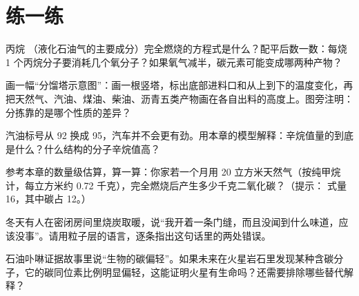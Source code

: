 \section*{练一练}

\begin{sikaoti}
\item 丙烷 （液化石油气的主要成分）完全燃烧的方程式是什么？配平后数一数：每烧 1 个丙烷分子要消耗几个氧分子？如果氧气减半，碳元素可能变成哪两种产物？
\item 画一幅“分馏塔示意图”：画一根竖塔，标出底部进料口和从上到下的温度变化，再把天然气、汽油、煤油、柴油、沥青五类产物画在各自出料的高度上。图旁注明：分拣靠的是哪个性质的差异？
\item 汽油标号从 92 换成 95，汽车并不会更有劲。用本章的模型解释：辛烷值量的到底是什么？什么结构的分子辛烷值高？
\item 参考本章的数量级估算，算一算：你家若一个月用 20 立方米天然气（按纯甲烷计，每立方米约 0.72 千克），完全燃烧后产生多少千克二氧化碳？（提示： 式量 16，其中碳占 12。）
\item 冬天有人在密闭房间里烧炭取暖，说“我开着一条门缝，而且没闻到什么味道，应该没事”。请用粒子层的语言，逐条指出这句话里的两处错误。
\item 石油卟啉证据故事里说“生物的碳偏轻”。如果未来在火星岩石里发现某种含碳分子，它的碳同位素比例明显偏轻，这能证明火星有生命吗？还需要排除哪些替代解释？
\end{sikaoti}
